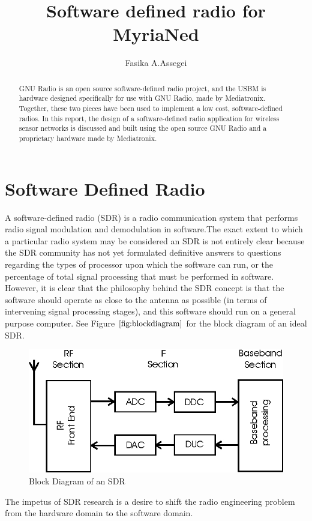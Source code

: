 \documentclass[a4paper,10pt]{article}
\title{Software defined radio for MyriaNed}
\author{Fasika A.Assegei}
\begin{document}
\maketitle
\newpage
\begin{abstract}
GNU Radio is an open source software-defined radio project, and the
USBM is hardware designed specifically for use with GNU Radio, made
by Mediatronix. Together, these two pieces have been used to
implement a low cost, software-defined radios. In this report,
the design of a software-defined radio application for
wireless sensor networks is discussed and built using the open source GNU Radio and
a proprietary hardware made by Mediatronix.
\end{abstract}
\newpage
\tableofcontents
\newpage
\section{Software Defined Radio}
A software-defined radio (SDR) is a
radio communication system that performs radio signal modulation and
demodulation in software.The exact extent to which a particular
radio system may be considered an SDR is not entirely clear because
the SDR community has not yet formulated definitive answers to
questions regarding the types of processor upon which the software
can run, or the percentage of total signal processing that must be
performed in software. However, it is clear that the philosophy
behind the SDR concept is that the software should operate as close
to the antenna as possible (in terms of intervening signal
processing stages), and this software should run on a general
purpose computer. See Figure $\ref{fig:blockdiagram}$ for the block
diagram of an ideal SDR.
\begin{figure}[b]
\centering
\includegraphics[width=0.8 \textwidth]{sdrblk}
\caption{Block Diagram of an SDR} \label{fig:blockdiagram}
\end{figure}
The impetus of SDR research is a desire to shift the radio
engineering problem from the hardware domain to the software domain.
\end{document}
